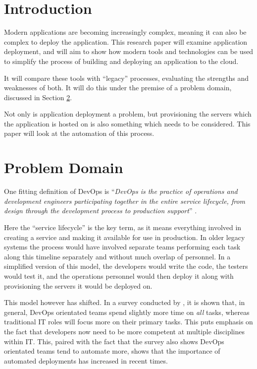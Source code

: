\documentclass{article}
\author{Stephen Coady}
\begin{document}
\hypersetup{pageanchor=false}

\thispagestyle{empty}
\hypersetup{pageanchor=true}
\newpage
\tableofcontents
\newpage

\newpage
\section{Introduction} %
\label{sec:Introduction}
Modern applications are becoming increasingly complex, meaning it can also be complex to deploy the application. This research paper will examine application deployment, and will aim to show how modern tools and technologies can be used to simplify the process of building and deploying an application to the cloud. 

It will compare these tools with ``legacy'' processes, evaluating the strengths and weaknesses of both. It will do this under the premise of a problem domain, discussed in Section \ref{sec:Problem}.

Not only is application deployment a problem, but provisioning the servers which the application is hosted on is also something which needs to be considered. This paper will look at the automation of this process.

\section{Problem Domain}
\label{sec:Problem}

One fitting definition of DevOps is ``\textit{DevOps is the practice of operations and development engineers participating together in the entire service lifecycle, from design through the development process to production support}'' \citep{devops}.

Here the ``service lifecycle'' is the key term, as it means everything involved in creating a service and making it available for use in production. In older legacy systems the process would have involved separate teams performing each task along this timeline separately and without much overlap of personnel. In a simplified version of this model, the developers would write the code, the testers would test it, and the operations personnel would then deploy it along with provisioning the servers it would be deployed on.

This model however has shifted. In a survey conducted by \citep{survey}, it is shown that, in general, DevOps orientated teams spend slightly more time on \textit{all} tasks, whereas traditional IT roles will focus more on their primary tasks. This puts emphasis on the fact that developers now need to be more competent at multiple disciplines within IT. This, paired with the fact that the survey also shows DevOps orientated teams tend to automate more, shows that the importance of automated deployments has increased in recent times. 
\end{document}
